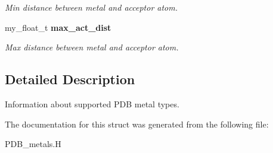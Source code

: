 \begin{CompactItemize}
\begin{CompactList}\small\item\em Min distance between metal and acceptor atom. \item\end{CompactList}\item 
my\_\-float\_\-t \bf{max\_\-act\_\-dist}\label{structSimSite3D_1_1pdb__metal__info__t_5ddea155e9606c373fdaaa47235b6adf}

\begin{CompactList}\small\item\em Max distance between metal and acceptor atom. \item\end{CompactList}\end{CompactItemize}


\subsection{Detailed Description}
Information about supported PDB metal types. 



The documentation for this struct was generated from the following file:\begin{CompactItemize}
\item 
PDB\_\-metals.H\end{CompactItemize}
